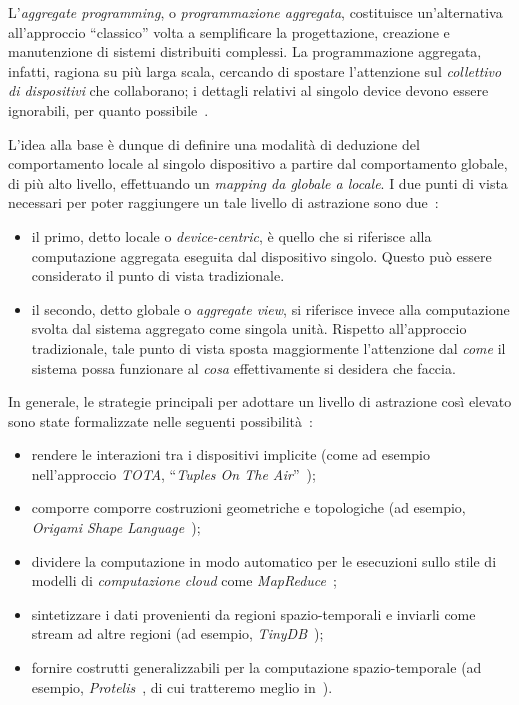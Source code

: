 L'\emph{aggregate programming}, o \emph{programmazione aggregata}, costituisce un'alternativa all'approccio ``classico''
volta a semplificare la progettazione, creazione e manutenzione di sistemi distribuiti complessi.
La programmazione aggregata, infatti, ragiona su più larga scala, cercando di spostare l'attenzione sul \emph{collettivo di dispositivi} che collaborano;
i dettagli relativi al singolo device devono essere ignorabili, per quanto possibile~\cite{7274429}.

L'idea alla base è dunque di definire una modalità di deduzione del comportamento locale al singolo dispositivo a partire dal comportamento globale, di più alto livello,
effettuando un \emph{mapping da globale a locale}.
I due punti di vista necessari per poter raggiungere un tale livello di astrazione sono due~\cite{aggregatescala-pmldc2016}:

\begin{itemize}
    \item
        il primo, detto locale o \emph{device-centric}, è quello che si riferisce alla computazione aggregata eseguita dal dispositivo singolo.
        Questo può essere considerato il punto di vista tradizionale.
    \item
        il secondo, detto globale o \emph{aggregate view}, si riferisce invece alla computazione svolta dal sistema aggregato come singola unità.
        Rispetto all'approccio tradizionale, tale punto di vista sposta maggiormente l'attenzione dal \emph{come} il sistema possa funzionare
        al \emph{cosa} effettivamente si desidera che faccia.
\end{itemize}

In generale, le strategie principali per adottare un livello di astrazione così elevato sono state formalizzate nelle seguenti possibilità~\cite{7274429}:

\begin{itemize}
  \item rendere le interazioni tra i dispositivi implicite (come ad esempio nell'approccio \emph{TOTA}, ``\emph{Tuples On The Air}''~\cite{10.1145/1538942.1538945});
  \item comporre comporre costruzioni geometriche e topologiche (ad esempio, \emph{Origami Shape Language}~\cite{nagpal2001programmable});
  \item dividere la computazione in modo automatico per le esecuzioni sullo stile di modelli di \emph{computazione cloud} come \emph{MapReduce}~\cite{10.1145/1327452.1327492};
  \item sintetizzare i dati provenienti da regioni spazio-temporali e inviarli come stream ad altre regioni (ad esempio, \emph{TinyDB}~\cite{1017485});
  \item fornire costrutti generalizzabili per la computazione spazio-temporale (ad esempio, \emph{Protelis}~\cite{PianiniSASOTutorial2017}, di cui tratteremo meglio in~).
\end{itemize}

